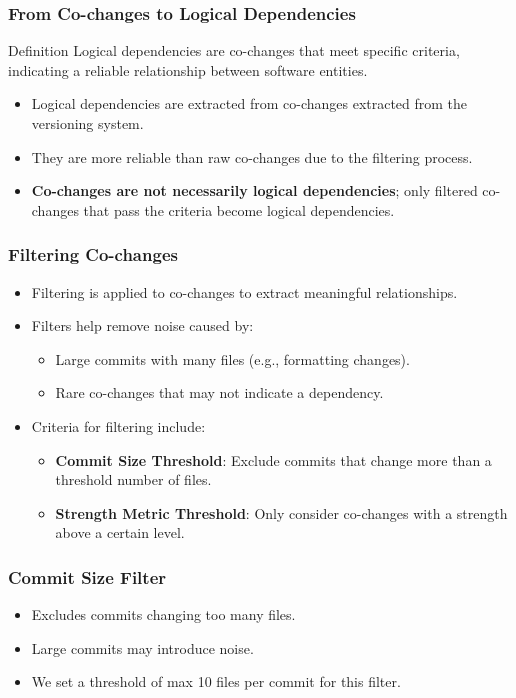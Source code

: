 \documentclass{beamer}
\begin{document}
\begin{frame}
\frametitle{From Co-changes to Logical Dependencies}
\begin{block}{Definition}
Logical dependencies are co-changes that meet specific criteria, indicating a reliable relationship between software entities.
\end{block}
\begin{itemize}
    \item Logical dependencies are extracted from co-changes extracted from the versioning system.
    \item They are more reliable than raw co-changes due to the filtering process.
    \item \textbf{Co-changes are not necessarily logical dependencies}; only filtered co-changes that pass the criteria become logical dependencies.
\end{itemize}
\end{frame}


\begin{frame}
\frametitle{Filtering Co-changes}
\begin{itemize}
    \item Filtering is applied to co-changes to extract meaningful relationships.
    \item Filters help remove noise caused by:
    \begin{itemize}
        \item Large commits with many files (e.g., formatting changes).
        \item Rare co-changes that may not indicate a dependency.
    \end{itemize}
    \item Criteria for filtering include:
    \begin{itemize}
        \item \textbf{Commit Size Threshold}: Exclude commits that change more than a threshold number of files.
        \item \textbf{Strength Metric Threshold}: Only consider co-changes with a strength above a certain level.
    \end{itemize}
\end{itemize}
\end{frame}


\begin{frame}
\frametitle{Commit Size Filter}
\begin{itemize}
    \item Excludes commits changing too many files.
    \item Large commits may introduce noise.
    \item We set a threshold of max 10 files per commit for this filter.
\end{itemize}
\end{frame}
\end{document}
